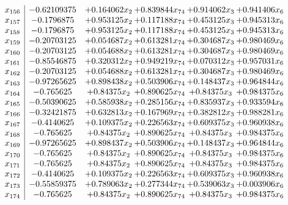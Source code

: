 \documentclass[11pt]{article}
\begin{document}
\[\begin{array}{c| c c@{\hskip 2pt} c@{\hskip 2pt} c@{\hskip 2pt} c@{\hskip 2pt} }
 x_{156}   &  -0.62109375 & + 0.164062 x_{2} & + 0.839844 x_{74} & + 0.914062 x_{3} & + 0.941406 x_{6}\\
 x_{157}   &  -0.1796875 & + 0.953125 x_{2} & + 0.117188 x_{74} & + 0.453125 x_{3} & + 0.945313 x_{6}\\
 x_{158}   &  -0.1796875 & + 0.953125 x_{2} & + 0.117188 x_{74} & + 0.453125 x_{3} & + 0.945313 x_{6}\\
 x_{159}   &  -0.20703125 & + 0.054687 x_{2} & + 0.613281 x_{74} & + 0.304687 x_{3} & + 0.980469 x_{6}\\
 x_{160}   &  -0.20703125 & + 0.054688 x_{2} & + 0.613281 x_{74} & + 0.304687 x_{3} & + 0.980469 x_{6}\\
 x_{161}   &  -0.85546875 & + 0.320312 x_{2} & + 0.949219 x_{74} & + 0.070312 x_{3} & + 0.957031 x_{6}\\
 x_{162}   &  -0.20703125 & + 0.054688 x_{2} & + 0.613281 x_{74} & + 0.304687 x_{3} & + 0.980469 x_{6}\\
 x_{163}   &  -0.97265625 & + 0.898438 x_{2} & + 0.503906 x_{74} & + 0.148437 x_{3} & + 0.964844 x_{6}\\
 x_{164}   &  -0.765625 & + 0.84375 x_{2} & + 0.890625 x_{74} & + 0.84375 x_{3} & + 0.984375 x_{6}\\
 x_{165}   &  -0.50390625 & + 0.585938 x_{2} & + 0.285156 x_{74} & + 0.835937 x_{3} & + 0.933594 x_{6}\\
 x_{166}   &  -0.32421875 & + 0.632813 x_{2} & + 0.167969 x_{74} & + 0.382812 x_{3} & + 0.988281 x_{6}\\
 x_{167}   &  -0.4140625 & + 0.109375 x_{2} & + 0.226563 x_{74} & + 0.609375 x_{3} & + 0.960938 x_{6}\\
 x_{168}   &  -0.765625 & + 0.84375 x_{2} & + 0.890625 x_{74} & + 0.84375 x_{3} & + 0.984375 x_{6}\\
 x_{169}   &  -0.97265625 & + 0.898437 x_{2} & + 0.503906 x_{74} & + 0.148437 x_{3} & + 0.964844 x_{6}\\
 x_{170}   &  -0.765625 & + 0.84375 x_{2} & + 0.890625 x_{74} & + 0.84375 x_{3} & + 0.984375 x_{6}\\
 x_{171}   &  -0.765625 & + 0.84375 x_{2} & + 0.890625 x_{74} & + 0.84375 x_{3} & + 0.984375 x_{6}\\
 x_{172}   &  -0.4140625 & + 0.109375 x_{2} & + 0.226563 x_{74} & + 0.609375 x_{3} & + 0.960938 x_{6}\\
 x_{173}   &  -0.55859375 & + 0.789063 x_{2} & + 0.277344 x_{74} & + 0.539063 x_{3} & + 0.003906 x_{6}\\
 x_{174}   &  -0.765625 & + 0.84375 x_{2} & + 0.890625 x_{74} & + 0.84375 x_{3} & + 0.984375 x_{6}\\

\end{array}\]
\end{document}

